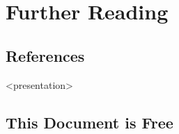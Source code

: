 \appendix

\section{Further Reading}

%
\subsection{References}

  \begin{frame}<presentation>{\insertsubsection}
    {}
    
    \nocite{maturana2004maquinas}
    \nocite{johnson2002emergence}
    \nocite{beck2004extreme}
    \nocite{pink2011drive}
  \end{frame}

%
\subsection{This Document is Free}


